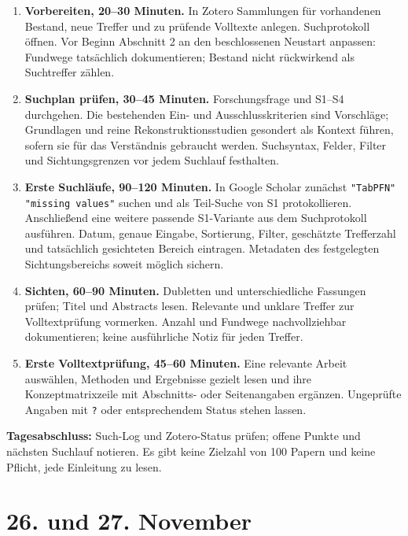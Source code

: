 \documentclass[11pt,a4paper]{article}
\begin{document}
\begin{enumerate}
  \item \textbf{Vorbereiten, 20--30 Minuten.} In Zotero Sammlungen für
  vorhandenen Bestand, neue Treffer und zu prüfende Volltexte anlegen.
  Suchprotokoll öffnen. Vor Beginn Abschnitt 2 an den beschlossenen
  Neustart anpassen: Fundwege tatsächlich dokumentieren; Bestand nicht
  rückwirkend als Suchtreffer zählen.
  \item \textbf{Suchplan prüfen, 30--45 Minuten.} Forschungsfrage und
  S1--S4 durchgehen. Die bestehenden Ein- und Ausschlusskriterien sind
  Vorschläge; Grundlagen und reine Rekonstruktionsstudien gesondert als
  Kontext führen, sofern sie für das Verständnis gebraucht werden. Suchsyntax,
  Felder, Filter und Sichtungsgrenzen vor jedem Suchlauf festhalten.
  \item \textbf{Erste Suchläufe, 90--120 Minuten.} In Google Scholar zunächst
  \texttt{"TabPFN" "missing values"} suchen und als Teil-Suche von S1
  protokollieren. Anschließend eine weitere passende S1-Variante aus dem
  Suchprotokoll ausführen. Datum, genaue Eingabe, Sortierung, Filter,
  geschätzte Trefferzahl und tatsächlich gesichteten Bereich eintragen.
  Metadaten des festgelegten Sichtungsbereichs soweit möglich sichern.
  \item \textbf{Sichten, 60--90 Minuten.} Dubletten und unterschiedliche
  Fassungen prüfen; Titel und Abstracts lesen. Relevante und unklare Treffer
  zur Volltextprüfung vormerken. Anzahl und Fundwege nachvollziehbar
  dokumentieren; keine ausführliche Notiz für jeden Treffer.
  \item \textbf{Erste Volltextprüfung, 45--60 Minuten.} Eine relevante
  Arbeit auswählen, Methoden und Ergebnisse gezielt lesen und ihre
  Konzeptmatrixzeile mit Abschnitts- oder Seitenangaben ergänzen.
  Ungeprüfte Angaben mit \texttt{?} oder entsprechendem Status stehen lassen.
\end{enumerate}

\textbf{Tagesabschluss:} Such-Log und Zotero-Status prüfen; offene Punkte und
nächsten Suchlauf notieren. Es gibt keine Zielzahl von 100 Papern und keine
Pflicht, jede Einleitung zu lesen.

\section{26. und 27. November}
\end{document}
